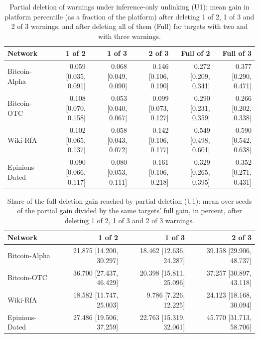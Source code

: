 \begin{table}[!t]
\centering
\scriptsize
\setlength{\tabcolsep}{3pt}
\caption{Partial deletion of warnings under inference-only unlinking (U1): mean gain in platform percentile (as a fraction of the platform) after deleting 1 of 2, 1 of 3 and 2 of 3 warnings, and after deleting all of them (Full) for targets with two and with three warnings.}
\label{tab:s_s_partial_deletion_gain}
\begin{tabular}{@{}lrrrrr@{}}
\toprule
\textbf{Network} & \textbf{1 of 2} & \textbf{1 of 3} & \textbf{2 of 3} & \textbf{Full of 2} & \textbf{Full of 3} \\
\midrule
Bitcoin-Alpha & 0.059 [0.035, 0.091] & 0.068 [0.049, 0.090] & 0.146 [0.106, 0.190] & 0.272 [0.209, 0.341] & 0.377 [0.290, 0.471] \\
Bitcoin-OTC & 0.108 [0.070, 0.158] & 0.053 [0.040, 0.067] & 0.099 [0.073, 0.127] & 0.290 [0.231, 0.359] & 0.266 [0.202, 0.338] \\
Wiki-RfA & 0.102 [0.065, 0.137] & 0.058 [0.043, 0.072] & 0.142 [0.106, 0.177] & 0.549 [0.498, 0.601] & 0.590 [0.542, 0.638] \\
Epinions-Dated & 0.090 [0.066, 0.117] & 0.080 [0.053, 0.111] & 0.161 [0.106, 0.218] & 0.329 [0.265, 0.395] & 0.352 [0.271, 0.431] \\
\bottomrule
\end{tabular}
\end{table}

\begin{table}[!t]
\centering
\scriptsize
\setlength{\tabcolsep}{3pt}
\caption{Share of the full deletion gain reached by partial deletion (U1): mean over seeds of the partial gain divided by the same targets' full gain, in percent, after deleting 1 of 2, 1 of 3 and 2 of 3 warnings.}
\label{tab:s_s_partial_deletion_share}
\begin{tabular}{@{}lrrr@{}}
\toprule
\textbf{Network} & \textbf{1 of 2} & \textbf{1 of 3} & \textbf{2 of 3} \\
\midrule
Bitcoin-Alpha & 21.875 [14.200, 30.297] & 18.462 [12.636, 24.287] & 39.158 [29.906, 48.737] \\
Bitcoin-OTC & 36.700 [27.437, 46.429] & 20.398 [15.811, 25.096] & 37.257 [30.897, 43.118] \\
Wiki-RfA & 18.582 [11.747, 25.003] & 9.786 [7.226, 12.225] & 24.123 [18.168, 30.094] \\
Epinions-Dated & 27.486 [19.506, 37.259] & 22.763 [15.319, 32.061] & 45.770 [31.713, 58.706] \\
\bottomrule
\end{tabular}
\end{table}
